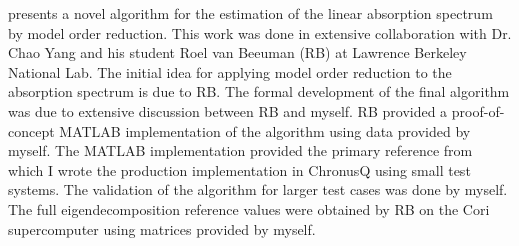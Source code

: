 {   presents a novel algorithm for the estimation of the linear absorption spectrum
  by model order reduction. This work was done in extensive collaboration with Dr. Chao Yang 
  and his student Roel van Beeuman (RB) at Lawrence Berkeley National Lab. The initial idea
  for applying model order reduction to the absorption spectrum is due to RB. The formal
  development of the final algorithm was due to extensive discussion between RB and myself.
  RB provided a proof-of-concept MATLAB implementation of the algorithm using data provided
  by myself. The MATLAB implementation provided the primary reference from which I wrote the 
  production implementation in ChronusQ using small test systems. The validation of the algorithm
  for larger test cases was done by myself. The full eigendecomposition reference values were
  obtained by RB on the Cori supercomputer using matrices provided by myself.
%
}


%
